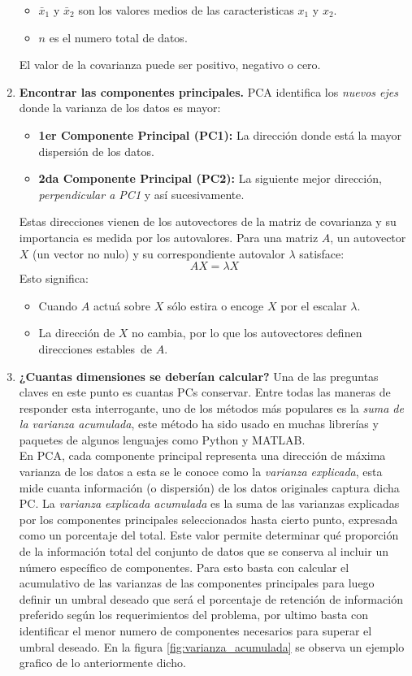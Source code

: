 \documentclass[12pt,letterpaper,oneside,openright]{book}
\begin{document}
\begin{enumerate}
\begin{itemize}
			\item $\bar{x}_1$ y $\bar{x}_2$ son los valores medios de las caracteristicas $x_1$ y $x_2$.
			\item $n$ es el numero total de datos.
		\end{itemize}
		El valor de la covarianza puede ser positivo, negativo o cero.
		\item \textbf{Encontrar las componentes principales.}
		PCA identifica los \textit{nuevos ejes} donde la varianza de los datos es mayor:
		\begin{itemize}
			\item \textbf{1er Componente Principal (PC1):} La dirección donde está la mayor dispersión de los datos.
			\item \textbf{2da Componente Principal (PC2):} La siguiente mejor dirección, \textit{perpendicular a PC1} y así sucesivamente.
		\end{itemize}
		Estas direcciones vienen de los autovectores de la matriz de covarianza y su importancia es medida por los autovalores. Para una matriz $A$, un autovector $X$ (un vector no nulo) y su correspondiente autovalor $\lambda$ satisface:
		\begin{equation}
			\label{eq:autovalores}
			AX = \lambda X
		\end{equation}
		Esto significa:
		\begin{itemize}
			\item Cuando $A$ actuá sobre $X$ sólo estira o encoge $X$ por el escalar $\lambda$.
			\item La dirección de $X$ no cambia, por lo que los autovectores definen \guillemetleft direcciones estables\guillemetright \ de $A$.
		\end{itemize}
		\item \textbf{¿Cuantas dimensiones se deberían calcular?}
		Una de las preguntas claves en este punto es cuantas PCs conservar. Entre todas las maneras de responder esta interrogante, uno de los métodos más populares es la \emph{suma de la varianza acumulada}, este método ha sido usado en muchas librerías y paquetes de algunos lenguajes como Python y MATLAB. \\
		En PCA, cada componente principal representa una dirección de máxima varianza de los datos a esta se le conoce como la \emph{varianza explicada}, esta mide cuanta información (o dispersión) de los datos originales captura dicha PC. La \emph{varianza explicada acumulada} es la suma de las varianzas explicadas por los componentes principales seleccionados hasta cierto punto, expresada como un porcentaje del total. Este valor permite determinar qué proporción de la información total del conjunto de datos que se conserva al incluir un número específico de componentes. Para esto basta con calcular el acumulativo de las varianzas de las componentes principales para luego definir un umbral deseado que será el porcentaje de retención de información preferido según los requerimientos del problema, por ultimo basta con identificar el menor numero de componentes necesarios para superar el umbral deseado. En la figura \ref{fig:varianza_acumulada} se observa un ejemplo grafico de lo anteriormente dicho.

\end{enumerate}
\end{document}

